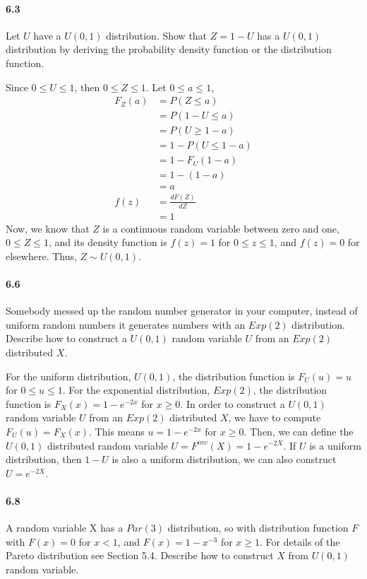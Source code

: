 \documentclass{article} %
\begin{document}
\paragraph*{6.3} Let $U$ have a $U(0, 1)$ distribution. Show that $Z = 1 - U$ has a $U(0, 1)$ distribution by deriving the probability density function or the distribution function. 

Since $0 \leq U \leq 1$, then $0 \leq Z \leq 1$. 
Let $0 \leq a \leq 1$, 
\begin{align*}
F_Z(a) & = P(Z \leq a) \\
&  = P(1-U \leq a)\\
&   = P(U \geq 1 - a) \\
& = 1 - P(U \leq 1 - a) \\
&  = 1 - F_U(1 - a) \\
& = 1 - (1 - a) \\
& = a \\
f(z) & = \frac{d F(Z)}{dZ} \\
& = 1 
\end{align*}
Now, we know that $Z$ is a continuous random variable between zero and one, $0 \leq Z \leq 1$, and its density function is $f(z) = 1$ for $0 \leq z \leq 1$, and $f(z) = 0$ for elsewhere. Thus, $Z \sim U(0, 1)$. 
 
\paragraph*{6.6} Somebody messed up the random number generator in your computer, instead of uniform random numbers it generates numbers with an $Exp(2)$ distribution. Describe how to construct a $U(0,1)$ random variable $U$ from an $Exp(2)$ distributed $X$. 

For the uniform distribution, $U(0, 1)$, the distribution function is $F_U(u) = u$ for $0 \leq u \leq 1$. For the exponential distribution, $Exp(2)$, the distribution function is $F_X(x) = 1 - e^{-2x}$ for $x \geq 0$. In order to construct a $U(0, 1)$ random variable $U$ from an $Exp(2)$ distributed $X$, we have to compute $F_U(u) = F_X(x)$. This means $u = 1-e^{-2x}$ for $x \geq 0$. Then, we can define the $U(0, 1)$ distributed random variable $U = F^{inv}(X) = 1-e^{-2X}$. If $U$ is a uniform distribution, then $1-U$ is also a uniform distribution, we can also construct $U = e^{-2X}$. 

\paragraph*{6.8} A random variable X has a $Par(3)$ distribution, so with distribution function $F$ with $F(x) = 0$ for $x < 1$, and $F(x) = 1-x^{-3}$ for $x \geq 1$. For details of the Pareto distribution see Section 5.4. Describe how to construct $X$ from $U(0, 1)$ random variable. 
\end{document}
